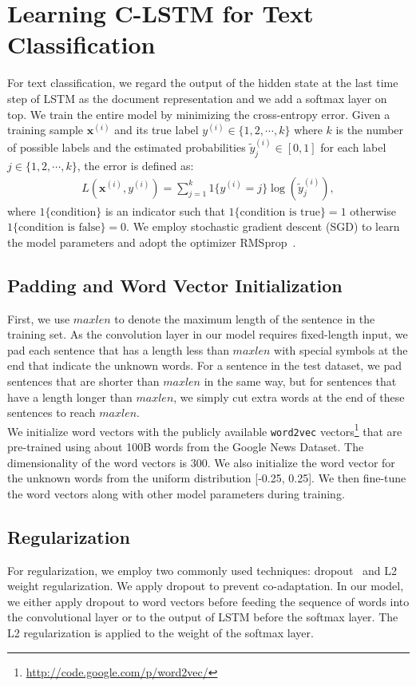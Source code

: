 \documentclass[11pt,letterpaper]{article}
\begin{document}
\section{Learning C-LSTM for Text Classification}
For text classification, we regard the output of the hidden state at the
last time step of LSTM as the document representation and we add a
softmax layer on top. We train the entire model by minimizing
the cross-entropy error. Given a training sample $\mathbf{x}^{(i)}$ and
its true label $y^{(i)} \in \{1,2, \cdots, k\}$ where $k$ is the number
of possible labels and the estimated probabilities
$\widetilde{y}_j^{(i)} \in [0,1]$ for each label $j \in
\{1,2,\cdots,k\}$, the error is defined as:
\begin{align}
L(\mathbf{x}^{(i)}, y^{(i)}) = \sum_{j=1}^{k}{1\{y^{(i)} = j
\}\log(\widetilde{y}_j^{(i)})},
\end{align}
where $1\{\text{condition}\}$ is an indicator such that $1\{\text{condition is
true}\} = 1$ otherwise $1\{\text{condition is false}\}=0$.
We employ stochastic gradient descent (SGD) to learn the model
parameters and adopt the optimizer RMSprop~\cite{rmsprop}.

\subsection{Padding and Word Vector Initialization} First, we use
$maxlen$ to denote the maximum length of the sentence in the training
set. As the
convolution layer in our model requires fixed-length input, we pad
each sentence that has a length less than $maxlen$ with special symbols
at the end that indicate the unknown words. For a sentence in the test
dataset, we pad sentences that are shorter than $maxlen$ in the same
way, but for sentences that have a length longer than $maxlen$, we
simply cut extra words at the end of these sentences to reach $maxlen$.\\
\indent We initialize word vectors with the publicly available
\texttt{word2vec} vectors\footnote{\url{http://code.google.com/p/word2vec/}}
that are pre-trained
using about 100B words from the Google News Dataset. The dimensionality of
the word vectors is 300. We also initialize the word vector for the unknown
words from the uniform distribution [-0.25, 0.25]. We then fine-tune the word
vectors along with other model parameters during training.

\subsection{Regularization}
For regularization, we employ two commonly used techniques:
dropout~\cite{dropout} and L2 weight regularization. We apply dropout to
prevent co-adaptation. In our model, we either apply dropout to word
vectors before feeding the sequence of words into the convolutional
layer or to the output of LSTM before the softmax layer. The L2
regularization is applied to the weight of the softmax layer.
\end{document}
